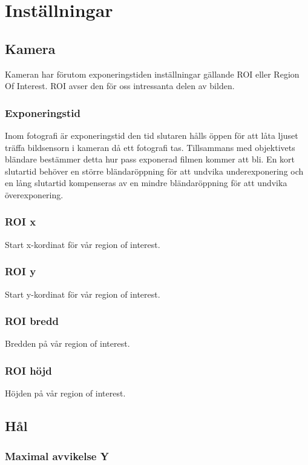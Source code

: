 \documentclass[a4paper]{article}
\begin{document}
\section{Inställningar}
	\subsection{Kamera}
		Kameran har förutom exponeringstiden inställningar gällande ROI eller Region Of Interest. ROI avser den för oss intressanta delen av bilden. 

	    \subsubsection{Exponeringstid}
		  Inom fotografi är exponeringstid den tid slutaren hålls öppen för att låta ljuset träffa bildsensorn i kameran då ett fotografi tas. 
		  Tillsammans med objektivets bländare bestämmer detta hur pass exponerad filmen kommer att bli. 
		  En kort slutartid behöver en större bländaröppning för att undvika underexponering och en lång slutartid kompenseras av en mindre bländaröppning för att undvika överexponering.

	    \subsubsection{ROI x}
		  Start x-kordinat för vår region of interest.

	    \subsubsection{ROI y}
		  Start y-kordinat för vår region of interest.

	    \subsubsection{ROI bredd}
		  Bredden på vår region of interest.

	    \subsubsection{ROI höjd}
		  Höjden på vår region of interest.

	\subsection{Hål}
	  \subsubsection{Maximal avvikelse Y}
\end{document}
